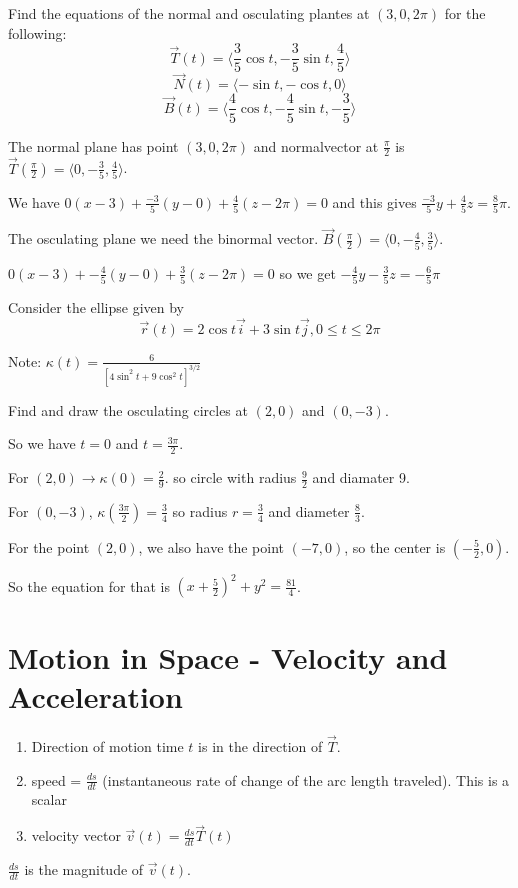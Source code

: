 \documentclass[../calc3.tex]{subfiles}
\begin{document}
\pagebreak
\begin{example}
    Find the equations of the normal and osculating plantes at $(3,0,2\pi)$ for the following:
    \[ \vec{T}(t)=\langle \frac{3}{5}\cos t, -\frac{3}{5}\sin t, \frac{4}{5}\rangle \]
    \[ \vec{N}(t) = \langle -\sin t,-\cos t,0\rangle \]
    \[ \vec{B}(t) = \langle \frac{4}{5}\cos t, -\frac{4}{5}\sin t, -\frac{3}{5}\rangle \]

    The normal plane has point $(3,0,2\pi)$ and normalvector at $\frac{\pi}{2}$ is $\vec{T}\left(\frac{\pi}{2}\right) = \langle 0,-\frac{3}{5},\frac{4}{5}\rangle$.

    We have $0(x-3)+\frac{-3}{5}(y-0)+\frac{4}{5}(z-2\pi)=0$ and this gives $\frac{-3}{5}y+\frac{4}{5}z=\frac{8}{5}\pi$.

    The osculating plane we need the binormal vector. $\vec{B}\left(\frac{\pi}{2}\right) = \langle 0,-\frac{4}{5},\frac{3}{5}\rangle$.

    $0(x-3)+-\frac{4}{5}(y-0)+\frac{3}{5}(z-2\pi)=0$ so we get $-\frac{4}{5}y-\frac{3}{5}z=-\frac{6}{5}\pi$
\end{example}

\begin{example}
    Consider the ellipse given by 
    \[ \vec{r}(t) = 2\cos t\vec{i}+3\sin t\vec{j}, 0\leq t\leq 2\pi \]

    Note: $\kappa(t)=\frac{6}{[4\sin^2 t+9\cos^2 t]^{3/2}}$

    Find and draw the osculating circles at $(2,0)$ and $(0,-3)$.

    So we have $t=0$ and $t=\frac{3\pi}{2}$.

    For $(2,0)\rightarrow \kappa(0)=\frac{2}{9}$. so circle with radius $\frac{9}{2}$ and diamater 9.
    
    For $(0,-3)$, $\kappa\left(\frac{3\pi}{2}\right) = \frac{3}{4}$ so radius $r=\frac{3}{4}$ and diameter $\frac{8}{3}$.

    For the point $(2,0)$, we also have the point $(-7,0)$, so the center is $\left(-\frac{5}{2},0\right)$.

    So the equation for that is $\left(x+\frac{5}{2}\right)^2 + y^2 = \frac{81}{4}$.
\end{example}

\section{Motion in Space - Velocity and Acceleration}
\begin{enumerate}
    \item Direction of motion time $t$ is in the direction of $\vec{T}$.
    \item speed = $\frac{ds}{dt}$ (instantaneous rate of change of the arc length traveled). This is a scalar
    \item velocity vector $\vec{v}(t)=\frac{ds}{dt}\vec{T}(t)$
\end{enumerate}
$\frac{ds}{dt}$ is the magnitude of $\vec{v}(t)$.
\end{document}
